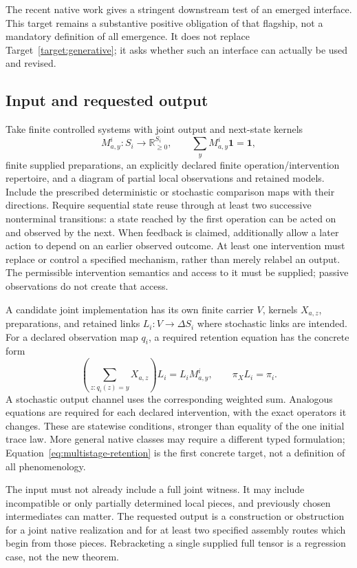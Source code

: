 \documentclass[11pt]{article}
\theoremstyle{remark}
\newcommand{\RR}{\mathbb R}
\newcommand{\one}{\mathbf 1}
\begin{document}
The recent native work gives a stringent downstream test of an emerged interface. This target remains a substantive positive obligation of that flagship, not a mandatory definition of all emergence. It does not replace Target~\ref{target:generative}; it asks whether such an interface can actually be used and revised.

\subsection{Input and requested output}

Take finite controlled systems with joint output and next-state kernels
\[
 M^i_{a,y}:S_i\longrightarrow\RR_{\geq0}^{S_i},
 \qquad \sum_y M^i_{a,y}\one=\one,
\]
finite supplied preparations, an explicitly declared finite operation/intervention repertoire, and a diagram of partial local observations and retained models. Include the prescribed deterministic or stochastic comparison maps with their directions. Require sequential state reuse through at least two successive nonterminal transitions: a state reached by the first operation can be acted on and observed by the next. When feedback is claimed, additionally allow a later action to depend on an earlier observed outcome. At least one intervention must replace or control a specified mechanism, rather than merely relabel an output. The permissible intervention semantics and access to it must be supplied; passive observations do not create that access.

A candidate joint implementation has its own finite carrier $V$, kernels $X_{a,z}$, preparations, and retained links $L_i:V\to\Delta S_i$ where stochastic links are intended. For a declared observation map $q_i$, a required retention equation has the concrete form
\begin{equation}
 \left(\sum_{z:q_i(z)=y}X_{a,z}\right)L_i
 =L_iM^i_{a,y},\qquad \pi_XL_i=\pi_i.
 \label{eq:multistage-retention}
\end{equation}
A stochastic output channel uses the corresponding weighted sum. Analogous equations are required for each declared intervention, with the exact operators it changes. These are statewise conditions, stronger than equality of the one initial trace law. More general native classes may require a different typed formulation; Equation~\eqref{eq:multistage-retention} is the first concrete target, not a definition of all phenomenology.

The input must not already include a full joint witness. It may include incompatible or only partially determined local pieces, and previously chosen intermediates can matter. The requested output is a construction or obstruction for a joint native realization and for at least two specified assembly routes which begin from those pieces. Rebracketing a single supplied full tensor is a regression case, not the new theorem.
\end{document}

